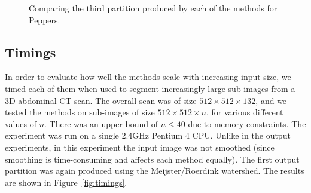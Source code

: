 \documentclass[preprint,a4paper]{elsarticle}
\newenvironment{stusubfig}[1]
{
	\begin{figure}[#1]
	\begin{center}
}
{
	\end{center}
	\end{figure}
}
\begin{document}
\begin{stusubfig}{p}
	\hspace{4mm}%
	\hspace{4mm}%
\caption[]{Comparing the third partition produced by each of the methods for Peppers.}
\label{fig:results-peppers}
\end{stusubfig}
\fi

\subsection{Timings}

In order to evaluate how well the methods scale with increasing input size, we timed each of them when used to segment increasingly large sub-images from a 3D abdominal CT scan\footnotemark{}. The overall scan was of size $512 \times 512 \times 132$, and we tested the methods on sub-images of size $512 \times 512 \times n$, for various different values of $n$. There was an upper bound of $n \le 40$ due to memory constraints. The experiment was run on a single 2.4GHz Pentium 4 CPU. Unlike in the output experiments, in this experiment the input image was not smoothed (since smoothing is time-consuming and affects each method equally). The first output partition was again produced using the Meijster/Roerdink watershed. The results are shown in Figure~\ref{fig:timings}.
\end{document}
